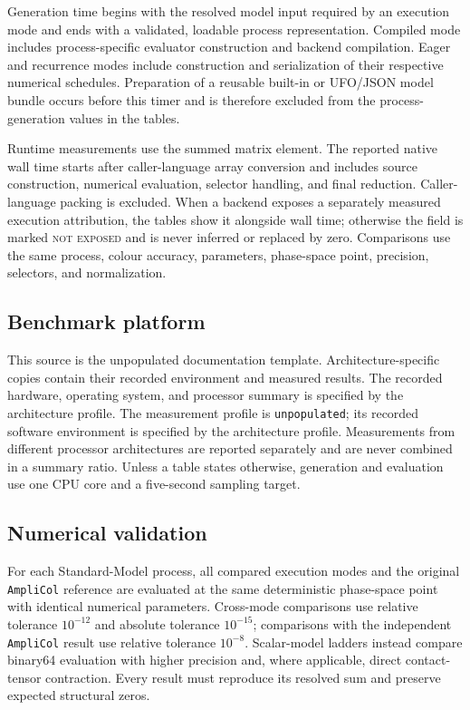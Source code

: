 \documentclass[10pt,letterpaper]{article}
\newcommand{\AC}{\texttt{AmpliCol}}
\newcommand{\ReportProfileName}{unpopulated}
\newcommand{\ReportPlatformSummary}{specified by the architecture profile}
\newcommand{\ReportToolchainSummary}{specified by the architecture profile}
\newcommand{\ReportEditionStatement}{This source is the unpopulated
  documentation template. Architecture-specific copies contain their recorded
  environment and measured results.}
\begin{document}
Generation time begins with the resolved model input required by an execution
mode and ends with a validated, loadable process representation. Compiled mode
includes process-specific evaluator construction and backend compilation.
Eager and recurrence modes include construction and serialization of their
respective numerical schedules. Preparation of a reusable built-in or UFO/JSON
model bundle occurs before this timer and is therefore excluded from the
process-generation values in the tables.

Runtime measurements use the summed matrix element. The reported native wall
time starts after caller-language array conversion and includes source
construction, numerical evaluation, selector handling, and final reduction.
Caller-language packing is excluded. When a backend exposes a separately
measured execution attribution, the tables show it alongside wall time;
otherwise the field is marked \textsc{not exposed} and is never inferred or
replaced by zero. Comparisons use the same process, colour accuracy,
parameters, phase-space point, precision, selectors, and normalization.

\subsection{Benchmark platform}

\ReportEditionStatement{} The recorded hardware, operating system, and processor
summary is \ReportPlatformSummary. The measurement profile is
\texttt{\ReportProfileName}; its recorded software environment is
\ReportToolchainSummary. Measurements from different processor architectures
are reported separately and are never combined in a summary ratio. Unless a
table states otherwise, generation and evaluation use one CPU core and a
five-second sampling target.

\subsection{Numerical validation}

For each Standard-Model process, all compared execution modes and the original
\AC{} reference are evaluated at the same deterministic phase-space point with
identical numerical parameters. Cross-mode comparisons use relative tolerance
$10^{-12}$ and absolute tolerance $10^{-15}$; comparisons with the
independent \AC{} result use relative tolerance $10^{-8}$. Scalar-model
ladders instead compare binary64 evaluation with higher precision and, where
applicable, direct contact-tensor contraction. Every result must reproduce its
resolved sum and preserve expected structural zeros.
\end{document}
